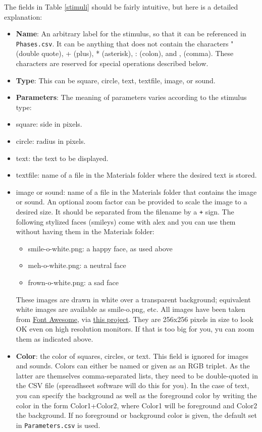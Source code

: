 \documentclass[11pt,]{article}
\begin{document}
The fields in Table \ref{stimuli} should be fairly intuitive, but here
is a detailed explanation:

\begin{itemize}
\item
  \textbf{Name}: An arbitrary label for the stimulus, so that it can be
  referenced in \texttt{Phases.csv}. It can be anything that does not
  contain the characters " (double quote), + (plus), * (asterisk), :
  (colon), and , (comma). These characters are reserved for special
  operations described below.
\item
  \textbf{Type}: This can be square, circle, text, textfile, image, or
  sound.
\item
  \textbf{Parameters}: The meaning of parameters varies according to the
  stimulus type:
\item
  square: side in pixels.
\item
  circle: radius in pixels.
\item
  text: the text to be displayed.
\item
  textfile: name of a file in the Materials folder where the desired
  text is stored.
\item
  image or sound: name of a file in the Materials folder that contains
  the image or sound. An optional zoom factor can be provided to scale
  the image to a desired size. It should be separated from the filename
  by a \texttt{+} sign. The following stylized faces (smileys) come with
  alex and you can use them without having them in the Materials folder:

  \begin{itemize}
  \item
    smile-o-white.png: a happy face, as used above
  \item
    meh-o-white.png: a neutral face
  \item
    frown-o-white.png: a sad face
  \end{itemize}

  These images are drawn in white over a transparent background;
  equivalent white images are available as smile-o.png, etc. All images
  have been taken from
  \href{http://fortawesome.github.io/Font-Awesome}{Font Awesome}, via
  \href{https://github.com/encharm/Font-Awesome-SVG-PNG}{this project}.
  They are 256x256 pixels in size to look OK even on high resolution
  monitors. If that is too big for you, yu can zoom them as indicated
  above.
\item
  \textbf{Color}: the color of squares, circles, or text. This field is
  ignored for images and sounds. Colors can either be named or given as
  an RGB triplet. As the latter are themselves comma-separated lists,
  they need to be double-quoted in the CSV file (spreadhseet software
  will do this for you). In the case of text, you can specify the
  background as well as the foreground color by writing the color in the
  form Color1+Color2, where Color1 will be foreground and Color2 the
  background. If no foreground or background color is given, the default
  set in \texttt{Parameters.csv} is used.
\end{itemize}
\end{document}
